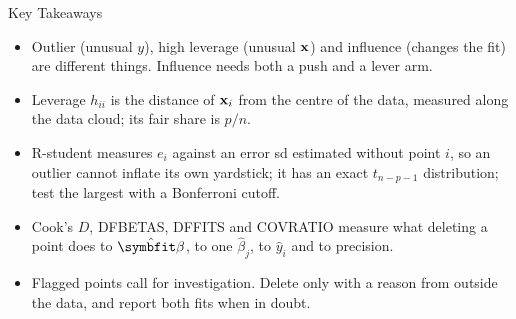 \begin{frame}{Key Takeaways}
    \begin{itemize}
        \item Outlier (unusual $y$), high leverage (unusual $\mathbf{x}$) and influence (changes the fit) are different things. Influence needs both a push and a lever arm.
        \item Leverage $h_{ii}$ is the distance of $\mathbf{x}_i$ from the centre of the data, measured along the data cloud; its fair share is $p/n$.
        \item R-student measures $e_i$ against an error sd estimated without point $i$, so an outlier cannot inflate its own yardstick; it has an exact $t_{n-p-1}$ distribution; test the largest with a Bonferroni cutoff.
        \item Cook's $D$, DFBETAS, DFFITS and COVRATIO measure what deleting a point does to $\hat{\bbeta}$, to one $\hat\beta_j$, to $\hat y_i$ and to precision.
        \item Flagged points call for investigation. Delete only with a reason from outside the data, and report both fits when in doubt.
    \end{itemize}
\end{frame}

